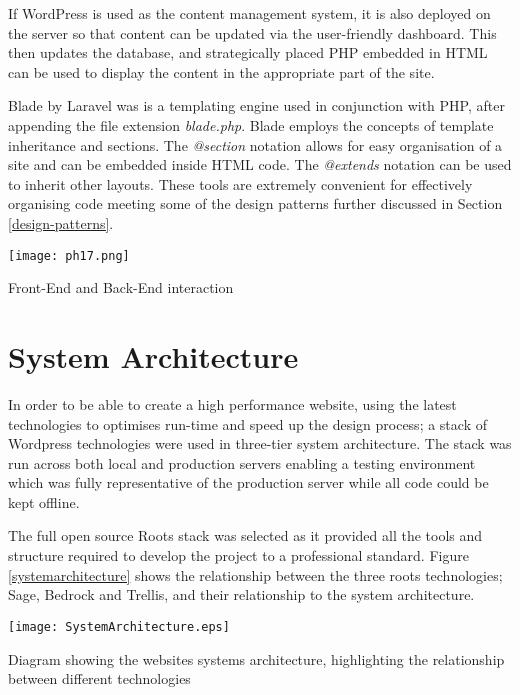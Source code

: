 \documentclass[fontsize=11pt]{extarticle}
\numberwithin{figure}{section} %
\begin{document}
If WordPress is used as the content management system, it is also
deployed on the server so that content can be updated via the
user-friendly dashboard. This then updates the database, and
strategically placed PHP embedded in HTML can be used to display the
content in the appropriate part of the site.

Blade by Laravel was is a templating engine used in conjunction with
PHP, after appending the file extension \emph{blade.php}. Blade employs
the concepts of template inheritance and sections. The \emph{@section}
notation allows for easy organisation of a site and can be embedded
inside HTML code. The \emph{@extends} notation can be used to inherit
other layouts. These tools are extremely convenient for effectively
organising code \cite{p18} meeting some of the design patterns further
discussed in Section \ref{design-patterns}.

\begin{table}[H]
      \centering
      \texttt{[image: ph17.png]}
      \caption{Front-End and Back-End interaction}
 \end{table}

\newpage

\hypertarget{system-architecture}{%
\section{System Architecture}\label{system-architecture}}

In order to be able to create a high performance website, using the
latest technologies to optimises run-time and speed up the design
process; a stack of Wordpress technologies were used in three-tier
system architecture. The stack was run across both local and production
servers enabling a testing environment which was fully representative of
the production server while all code could be kept offline.

The full open source Roots stack \cite{rootsweb} was selected as it
provided all the tools and structure required to develop the project to
a professional standard. Figure \ref{systemarchitecture} shows the
relationship between the three roots technologies; Sage, Bedrock and
Trellis, and their relationship to the system architecture.

\begin{table}[H]
\centering
\texttt{[image: SystemArchitecture.eps]}
\caption{Diagram showing the websites systems architecture, highlighting the relationship between different technologies}
\label{systemarchitecture}
\end{table}
\end{document}
